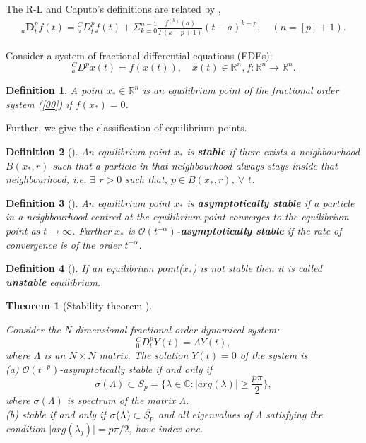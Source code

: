 \documentclass[pdflatex,sn-mathphys]{sn-jnl}%
\theoremstyle{thmstyleone}%
\newtheorem{theorem}{Theorem}%
\theoremstyle{thmstyletwo}%
\theoremstyle{thmstylethree}%
\newtheorem{definition}{Definition}%
\begin{document}
The R-L and Caputo's definitions are related by \cite{kilbas2006theory},
\begin{align}
{ }_{a}\mathbf{D}_{t}^{p} f(t)={ }_{a}^{C} D_{t}^{p} f(t) + \Sigma_{k=0}^{n-1}\frac{f^{(k)}(a)}{\Gamma(k-p+1)}(t-a)^{k-p}, \quad(n=[p]+1).
\label{RL caputo relation}
\end{align}

Consider a system of fractional differential equations (FDEs):
\begin{equation}
	{ }^C_{a} D^px(t) = f(x(t)), \quad x(t)\in \mathbb{R}^n, f: \mathbb{R}^n \rightarrow\mathbb{R}^n. \label{00}
\end{equation}

\begin{definition}
 A point $x_* \in \mathbb{R}^n$ is an equilibrium point of the fractional order system (\ref{00})  if $f(x_*)=0$.
\end{definition}

Further, we give the classification of equilibrium points.
\begin{definition}[]
\cite{landau2013fluid} An equilibrium point $x_*$ is \textbf{stable} if there exists a neighbourhood $B(x_*,r)$ such that a particle in that neighbourhood always stays inside that neighbourhood,  i.e.  $\exists$ $r>0 $ such that, $p \in B(x_*,r)$, $\forall$ $t$.
\end{definition}

\begin{definition}[]
\cite{landau2013fluid} An equilibrium point $x_*$ is \textbf{asymptotically stable} if a particle in a neighbourhood centred at the equilibrium point converges to the equilibrium point as $t\rightarrow \infty$.
Further $x_*$ is
\textbf{$ \mathcal{O}(t^{-\alpha})$-asymptotically stable} if the rate of convergence is of the order $ t^{-\alpha}$.
\end{definition}

\begin{definition}[]
\cite{landau2013fluid} If an equilibrium point($x_*$) is not stable then it is called \textbf{unstable} equilibrium.
\end{definition}

\begin{theorem}[Stability theorem  \citep{matignon1996stability} ]\label{stability thm}
 
Consider the N-dimensional fractional-order dynamical system: $${}_{0}^{C}D_{t}^{p}Y(t) = \Lambda Y(t), $$ where $\Lambda$ is an $N\times N$ matrix. The solution $Y(t) = 0$ of the system is \\
(a)  $ \mathcal{O}(t^{-p})$-asymptotically stable if and only if $$  \sigma(\Lambda) \subset S_p = \lbrace \lambda\in \mathbb{C}: \vert arg(\lambda) \vert \geqslant \frac{p\pi}{2}  \rbrace,$$ where $\sigma(\Lambda)$ is spectrum of the matrix $\Lambda$.\\
(b) stable if and only if  $  \sigma(\Lambda) \subset \Bar{S_p}  $ and all eigenvalues of $\Lambda $ satisfying the condition $\vert arg(\lambda_{j})\vert = p\pi/2$, have index one. 
\end{theorem}
\end{document}

